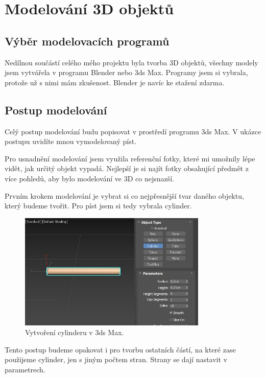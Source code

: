\documentclass[12pt, a4paper,
twoside,        %
openright
]{report}
\let\oldchapter\chapter
\renewcommand{\chapter}{
	\clearpage
	\pagestyle{fancy}
	\oldchapter
}
\begin{document}
	

\chapter {Modelování 3D objektů}



\section {Výběr modelovacích programů}
\label{vyber_modelovacich_programu}
Nedílnou součástí celého mého projektu byla tvorba 3D objektů, všechny modely jsem vytvářela v programu Blender nebo 3ds Max. Programy jsem si vybrala, protože už s nimi mám zkušenost. Blender je navíc ke stažení zdarma. 

\section {Postup modelování}
Celý postup modelování budu popisovat v prostředí programu 3ds Max. V ukázce postupu uvidíte mnou vymodelovaný píst.

Pro usnadnění modelování jsem využila referenční fotky, které mi umožnily lépe vidět, jak určitý objekt vypadá. Nejlepší je si najít fotky obsahující předmět z více pohledů, aby bylo modelování ve 3D co nejsnazší.  

Prvním krokem modelování je vybrat si co nejpřesnější tvar daného objektu, který budeme tvořit. Pro píst jsem si tedy vybrala cylinder.  

\begin{figure}[h!]
	\centering 
	\includegraphics[width=0.8\textwidth]{image/modelovani.jpg} 
	\caption{Vytvoření cylinderu v 3ds Max.} 
	\label{fig:modelovani_cast1} 
\end{figure}



Tento postup budeme opakovat i pro tvorbu ostatních částí, na které zase použijeme cylinder, jen s jiným počtem stran. Strany se dají nastavit v parametrech. 
\end{document}
